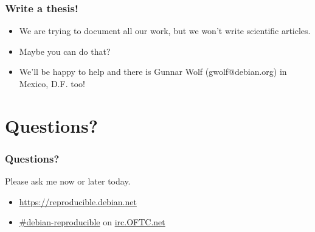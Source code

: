 \documentclass[14pt]{beamer}
\begin{document}
\begin{frame}
 \frametitle{Write a thesis!}

 \begin{itemize}
  \item We are trying to document all our work, but we won't write
  scientific articles.
  \item Maybe you can do that?
  \item We'll be happy to help and there is Gunnar Wolf (gwolf@debian.org) in
  Mexico, D.F. too!
 \end{itemize}
\end{frame}


\section{Questions?}

\begin{frame}
 \frametitle{Questions?}
 \begin{center}
  Please ask me now or later today.
 \end{center}
 \begin{itemize}
 \item\url{https://reproducible.debian.net}
 \item\url{#debian-reproducible} on \url{irc.OFTC.net}
 \end{itemize}
\end{frame}
\end{document}
